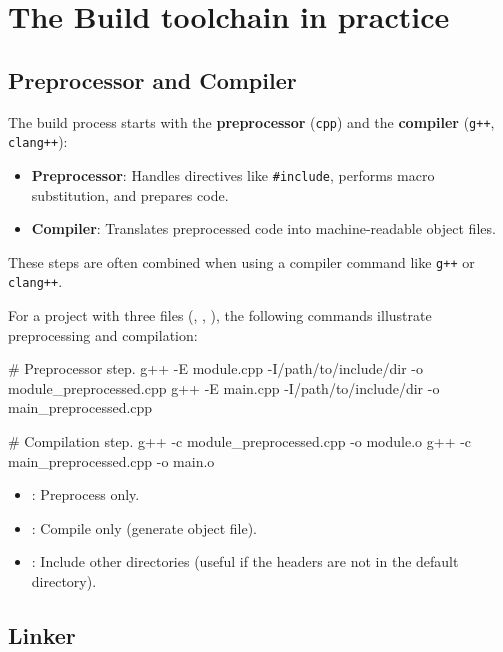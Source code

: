 \section{The Build toolchain in practice}

\subsection{Preprocessor and Compiler}

The build process starts with the \textbf{preprocessor} (\texttt{cpp}) and the \textbf{compiler} (\texttt{g++}, \texttt{clang++}):
\begin{itemize}
    \item \textbf{Preprocessor}: Handles directives like \texttt{\#include}, performs macro substitution, and prepares code.
    \item \textbf{Compiler}: Translates preprocessed code into machine-readable object files.
    \end{itemize}

These steps are often combined when using a compiler command like \texttt{g++} or \texttt{clang++}.


    For a project with three files (, , ), the following commands illustrate preprocessing and compilation:
    
    \begin{codeblock}[language=bash, numbers=none]
# Preprocessor step.
g++ -E module.cpp -I/path/to/include/dir -o module_preprocessed.cpp
g++ -E main.cpp -I/path/to/include/dir -o main_preprocessed.cpp

# Compilation step.
g++ -c module_preprocessed.cpp -o module.o
g++ -c main_preprocessed.cpp -o main.o
    \end{codeblock}

    \begin{observationblock}
        \begin{itemize}
            \item {}: Preprocess only.
            \item {}: Compile only (generate object file).
            \item {}: Include other directories (useful if the headers are not in the default directory).
        \end{itemize}
    \end{observationblock}


\subsection{Linker}


